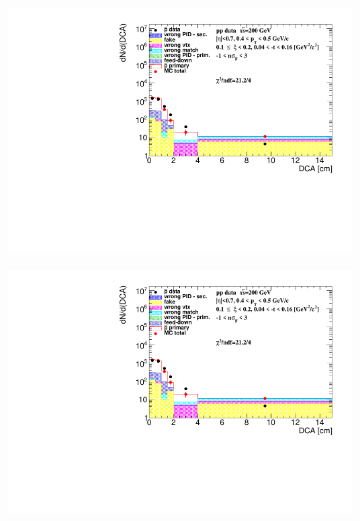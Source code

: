 \begin{figure}[h!]
\begin{subfigure}{.45\textwidth}
	\end{subfigure}
	\begin{subfigure}{.45\textwidth}
		\includegraphics[width=\linewidth, page=10]{chapters/chrgSTAR/img/DCAproton/background_p_bar_2.pdf}
	\end{subfigure}
	\begin{subfigure}{.45\textwidth}
		\includegraphics[width=\linewidth, page=13]{chapters/chrgSTAR/img/DCAproton/background_p_bar_2.pdf}
	\end{subfigure}
	\begin{subfigure}{.45\textwidth}

\end{subfigure}
\end{figure}
